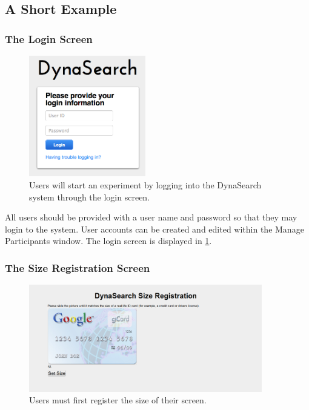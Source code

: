 \documentclass[article]{ij4uq}              %
\begin{document}
\subsection{A Short Example}

\subsubsection{The Login Screen}

\begin{figure}[h!]
 \centering
 \includegraphics[width=2.0in]{figures/ds_login.png}
 \caption{Users will start an experiment by logging into the DynaSearch system through the login screen.}
 \label{fig:login}
\end{figure}
\FloatBarrier

All users should be provided with a user name and password so that they may login to the system. User accounts can be created and edited within the Manage Participants window. The login screen is displayed in \ref{fig:login}.

\subsubsection{The Size Registration Screen}

\begin{figure}[h!]
 \centering
 \includegraphics[width=4.0in]{figures/size_reg.png}
 \caption{Users must first register the size of their screen.}
 \label{fig:sizereg}
\end{figure}
\FloatBarrier
\end{document}
